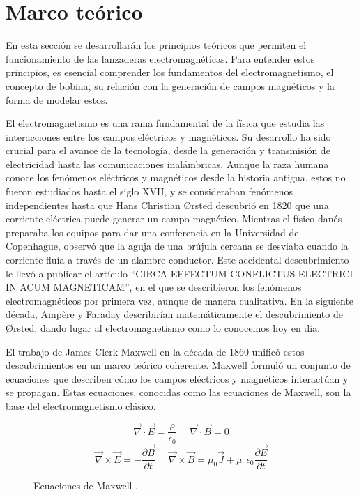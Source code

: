 \section{Marco teórico}
\label{sec:marcoteorico}

En esta sección se desarrollarán los principios teóricos que permiten el funcionamiento de las lanzaderas electromagnéticas. Para entender estos principios, es esencial comprender los fundamentos del electromagnetismo, el concepto de bobina, su relación con la generación de campos magnéticos y la forma de modelar estos.

El electromagnetismo es una rama fundamental de la física que estudia las interacciones entre los campos eléctricos y magnéticos. Su desarrollo ha sido crucial para el avance de la tecnología, desde la generación y transmisión de electricidad hasta las comunicaciones inalámbricas. Aunque la raza humana conoce los fenómenos eléctricos y magnéticos desde la historia antigua, estos no fueron estudiados hasta el siglo XVII, y se consideraban fenómenos independientes hasta que Hans Christian Ørsted descubrió en 1820 que una corriente eléctrica puede generar un campo magnético. Mientras el físico danés preparaba los equipos para dar una conferencia en la Universidad de Copenhague, observó que la aguja de una brújula cercana se desviaba cuando la corriente fluía a través de un alambre conductor. Este accidental descubrimiento le llevó a publicar el artículo ``CIRCA EFFECTUM CONFLICTUS ELECTRICI IN ACUM MAGNETICAM'', en el que se describieron los fenómenos electromagnéticos por primera vez, aunque de manera cualitativa. En la siguiente década, Ampère y Faraday describirían matemáticamente el descubrimiento de Ørsted, dando lugar al electromagnetismo como lo conocemos hoy en día\citep{oersted2024}.

El trabajo de James Clerk Maxwell en la década de 1860 unificó estos descubrimientos en un marco teórico coherente. Maxwell formuló un conjunto de ecuaciones que describen cómo los campos eléctricos y magnéticos interactúan y se propagan. Estas ecuaciones, conocidas como las ecuaciones de Maxwell, son la base del electromagnetismo clásico.

\begin{figure}[H]
    \centering %
    \[\vec{\nabla}\cdot \vec{E} = \frac{\rho}{\epsilon_0}~~~~~~\vec{\nabla}\cdot \vec{B} = 0\]
    \[\vec{\nabla}\times\vec{E} = -\frac{\partial\vec{B}}{\partial t}~~~~~~\vec{\nabla}\times \vec{B} = \mu_0\vec{J}+\mu_0\epsilon_0\frac{\partial \vec{E}}{\partial t}\]
    \caption{Ecuaciones de Maxwell \citep{purcell2013electricidad}.}
    \label{fig:ecuacionesMaxwell} %
\end{figure}

